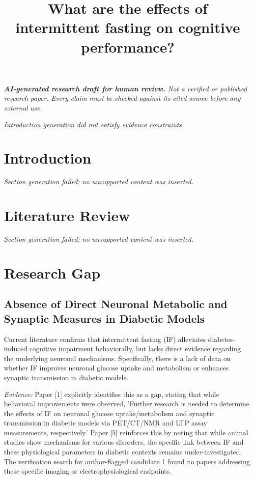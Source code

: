 \documentclass[11pt]{article}
\title{What are the effects of intermittent fasting on cognitive performance?}
\date{}
\begin{document}
\maketitle
\textit{\textbf{AI-generated research draft for human review.} Not a verified or published research paper. Every claim must be checked against its cited source before any external use.}\par

\textit{Introduction generation did not satisfy evidence constraints.}

\section{Introduction}
\textit{Section generation failed; no unsupported content was inserted.}

\section{Literature Review}
\textit{Section generation failed; no unsupported content was inserted.}

\section{Research Gap}
\subsection{Absence of Direct Neuronal Metabolic and Synaptic Measures in Diabetic Models}
Current literature confirms that intermittent fasting (IF) alleviates diabetes-induced cognitive impairment behaviorally, but lacks direct evidence regarding the underlying neuronal mechanisms. Specifically, there is a lack of data on whether IF improves neuronal glucose uptake and metabolism or enhances synaptic transmission in diabetic models.

\textit{Evidence:} Paper [1] explicitly identifies this as a gap, stating that while behavioral improvements were observed, 'Further research is needed to determine the effects of IF on neuronal glucose uptake/metabolism and synaptic transmission in diabetic models via PET/CT/NMR and LTP assay measurements, respectively.' Paper [5] reinforces this by noting that while animal studies show mechanisms for various disorders, the specific link between IF and these physiological parameters in diabetic contexts remains under-investigated. The verification search for author-flagged candidate 1 found no papers addressing these specific imaging or electrophysiological endpoints.
\end{document}
